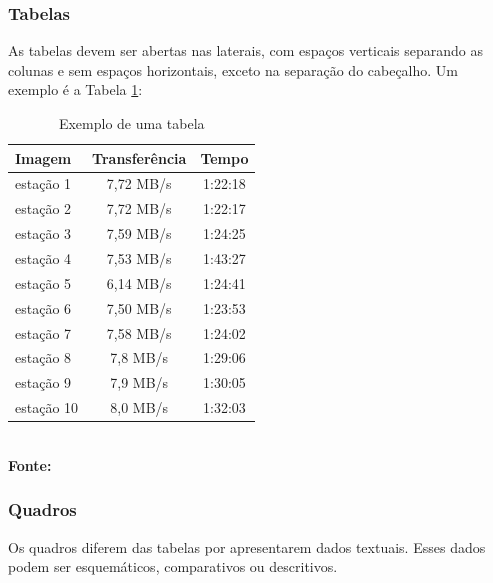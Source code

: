  \subsubsection{\esp Tabelas}

As tabelas devem ser abertas nas laterais, com espaços verticais separando
as colunas e sem espaços horizontais, exceto na
separação do cabeçalho. Um exemplo é a Tabela \ref{tab:tabela1}: 

\begin{table}[htb]
	\centering
	\caption{Exemplo de uma tabela}
	\vspace{-0.3cm} %
	\label{tab:tabela1}
	\begin{tabular}{l|c|c}
  \hline
    \textbf{Imagem}	& \textbf{Transferência} & \textbf{Tempo} \\
    \hline
     estação 1	& 7,72 MB/s &  1:22:18 \\
     estação 2	& 7,72 MB/s &  1:22:17 \\
     estação 3	& 7,59 MB/s & 1:24:25 \\
     estação 4  & 7,53 MB/s & 1:43:27 \\
     estação 5	& 6,14 MB/s  &  1:24:41 \\
     estação 6  &  7,50 MB/s & 1:23:53 \\
     estação 7  & 7,58 MB/s  &  1:24:02 \\
     estação 8  & 7,8 MB/s  &  1:29:06 \\
     estação 9  & 7,9 MB/s  &  1:30:05 \\
     estação 10 & 8,0 MB/s  &  1:32:03 \\
     \hline
 \end{tabular}
 	\vspace{.1cm}  %
	\small
	{\footnotesize\\ \textbf{Fonte: }}
\end{table}

\estrutura\subsubsection{\esp Quadros}\instrucao

Os quadros diferem das tabelas por apresentarem dados textuais.
Esses dados podem ser esquemáticos, comparativos ou descritivos.
  	
